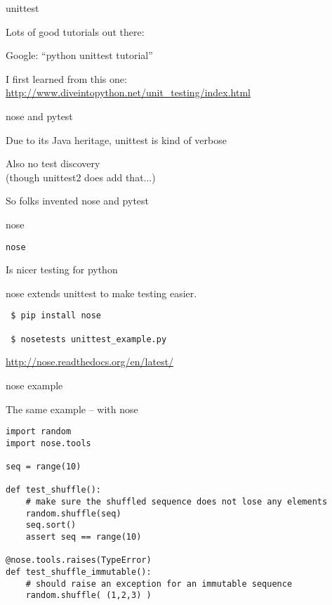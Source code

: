 \documentclass{beamer}
\begin{document}
\begin{frame}[fragile]{unittest}

{\Large Lots of good tutorials out there:}

\vfill
{\Large Google: ``python unittest tutorial''}

\vfill
{\Large I first learned from this one:}\\[0.1in]
\url{http://www.diveintopython.net/unit_testing/index.html}

\end{frame} 

\begin{frame}[fragile]{nose and pytest}

{\Large Due to its Java heritage, unittest is kind of verbose}

\vfill
{\Large Also no test discovery}\\
{\large \hspace{0.2in}(though unittest2 does add that...) }

\vfill
{\Large So folks invented nose and pytest}

\end{frame} 

\begin{frame}[fragile]{nose}

{\LARGE \verb|nose|}

\vfill
{\Large \hspace{0.2in} Is nicer testing for python}

\vfill
{\Large \hspace{0.2in} nose extends unittest to make testing easier.}

\vfill
\begin{verbatim}
 $ pip install nose

 $ nosetests unittest_example.py 
\end{verbatim}

\vfill
\url{http://nose.readthedocs.org/en/latest/}
\end{frame} 

\begin{frame}[fragile]{nose example}

{\Large The same example -- with nose}

{\small
\begin{verbatim}
import random
import nose.tools

seq = range(10)

def test_shuffle():
    # make sure the shuffled sequence does not lose any elements
    random.shuffle(seq)
    seq.sort()
    assert seq == range(10)

@nose.tools.raises(TypeError)
def test_shuffle_immutable():
    # should raise an exception for an immutable sequence
    random.shuffle( (1,2,3) )
\end{verbatim}
}

\end{frame} 
\end{document}
